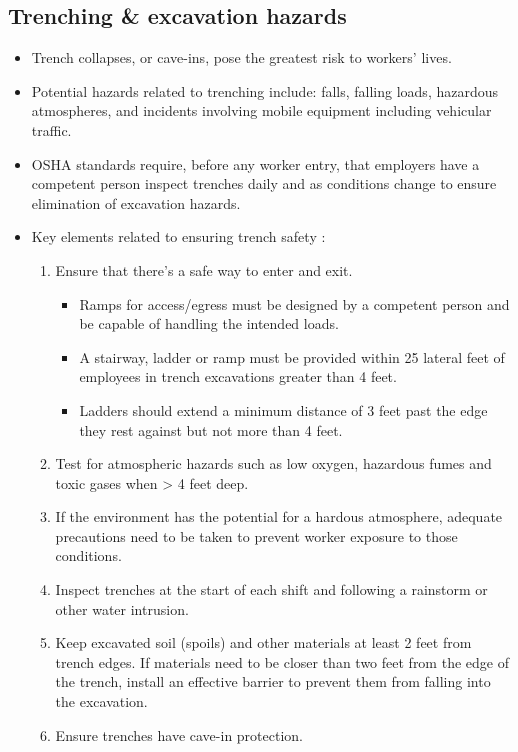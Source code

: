 \subsection{Trenching \& excavation hazards}
\begin{itemize}
\item Trench collapses, or cave-ins, pose the greatest risk to workers’ lives.
\item Potential hazards related to trenching include: falls, falling loads, hazardous atmospheres, and incidents involving mobile equipment including vehicular traffic.
\item OSHA  standards require, before any worker entry, that employers have a competent person
inspect trenches daily and as conditions change to ensure elimination of excavation hazards. 
\item Key elements related to ensuring trench safety :
\begin{enumerate}
\item Ensure that there's a safe way to enter and exit.
\begin{itemize}
\item Ramps for access/egress must be designed by a competent person and be capable of handling the intended loads.
\item A stairway, ladder or ramp must be provided within 25 lateral feet of employees in trench excavations greater than 4 feet.
\item Ladders should extend a minimum distance of 3 feet past the edge they rest against but not more than 4 feet. 
\end{itemize}
\item Test for atmospheric hazards such as low oxygen, hazardous fumes and toxic gases when > 4 feet deep.  
\item If the environment has the potential for a hardous atmosphere, adequate precautions need to be taken to prevent worker exposure to those conditions.
\item Inspect trenches at the start of each shift and following a rainstorm or
other water intrusion.
\item Keep excavated soil (spoils) and other materials at least 2 feet from trench edges. If materials need to be closer than two feet from the edge of the trench, install an effective barrier to prevent them from falling into the excavation.
\item Ensure trenches have cave-in protection.
\begin{itemize}

\end{itemize}
\end{enumerate}
\end{itemize}

